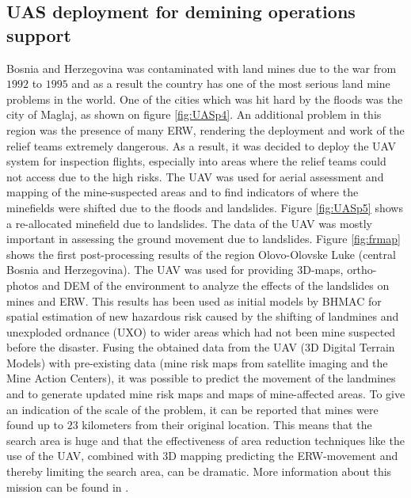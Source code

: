 \documentclass{article}
\begin{document}
\subsection{UAS deployment for demining operations support}
Bosnia and Herzegovina was contaminated with land mines due to the war from $1992$ to $1995$ and as a result the country has one of the most serious land mine problems in the world.
One of the cities which was hit hard by the floods was the city of Maglaj, as shown on figure \ref{fig:UASp4}. An additional problem in this region was the presence of many ERW, rendering the deployment and work of the relief teams extremely dangerous.
As a result, it was decided to deploy the UAV system for inspection flights, especially into areas where the relief teams could not access due to the high risks.
The UAV was used for aerial assessment and mapping of the mine-suspected areas and to find indicators of where the minefields were shifted due to the floods and landslides.
Figure  \ref{fig:UASp5} shows a re-allocated minefield due to landslides.
The data of the UAV was mostly important in assessing the ground movement due to  landslides.
Figure \ref{fig:frmap} shows the first post-processing results of the region Olovo-Olovske Luke (central Bosnia and Herzegovina).
The UAV was used for providing 3D-maps, ortho-photos and DEM of the environment to analyze the effects of the landslides on mines and ERW.
This results has been used as initial models by BHMAC for spatial estimation of new hazardous risk caused by the shifting of landmines and unexploded ordnance (UXO) to wider areas which had not been mine suspected before the disaster.
Fusing the obtained data from the UAV (3D Digital Terrain Models) with pre-existing data (mine risk maps from satellite imaging and the Mine Action Centers), it was possible to predict the movement of the landmines and to generate updated mine risk maps and maps of mine-affected areas.
To give an indication of the scale of the problem, it can be reported that mines were found up to $23$ kilometers from their original location.
This means that the search area is huge and that the effectiveness of area reduction techniques like the use of the UAV, combined with 3D mapping predicting the ERW-movement and thereby limiting the search area, can be dramatic. More information about this mission can be found in \cite{BosniaUAS}.
\end{document}
